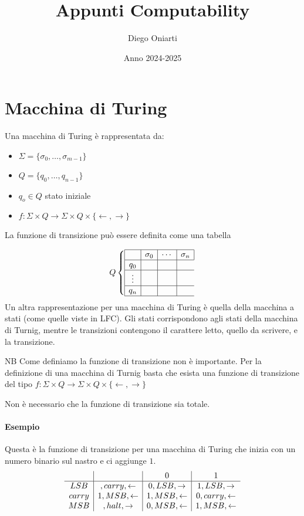 \documentclass{article}
\title{Appunti Computability}
\author{Diego Oniarti}
\date{Anno 2024-2025}
\begin{document}
\maketitle
\tableofcontents

\section{Macchina di Turing}
Una macchina di Turing è rappresentata da:
\begin{itemize}
    \item $\Sigma=\{\sigma_0,\dots,\sigma_{m-1}\}$
    \item $Q=\{q_0, \dots, q_{n-1}\}$
    \item $q_o \in Q$ stato iniziale
    \item $f:\Sigma\times Q \to \Sigma\times Q\times \{\leftarrow,\rightarrow\}$
\end{itemize}
La funzione di transizione può essere definita come una tabella

\[
    Q \left\{
        \begin{array}{|c|c|c|c|}
            \hline
            & \sigma_0 &\cdots& \sigma_n \\
            \hline
            q_0 & & \\
            \hline
            \vdots & & \\
            \hline
            q_n & & \\
            \hline
        \end{array}
    \right.
\]
Un altra rappresentazione per una macchina di Turing è quella della macchina a stati (come quelle viste in LFC). Gli stati corrispondono agli stati della macchina di Turnig, mentre le transizioni contengono il carattere letto, quello da scrivere, e la transizione.

\begin{callout}{NB}
    Come definiamo la funzione di transizione non è importante. Per la definizione di una macchina di Turnig basta che esista una funzione di transizione del tipo $f:\Sigma\times Q \to \Sigma\times Q\times \{\leftarrow,\rightarrow\}$

    Non è necessario che la funzione di transizione sia totale.
\end{callout}

\paragraph{Esempio}
Questa è la funzione di transizione per una macchina di Turing che inizia con un numero binario sul nastro e ci aggiunge $1$.
\[
    \begin{array}{c|c|c|c}
        & \textvisiblespace & 0 & 1 \\
        \hline
        LSB & \textvisiblespace,carry,\leftarrow & 0,LSB,\rightarrow & 1,LSB,\rightarrow \\
        carry & 1,MSB,\leftarrow& 1,MSB,\leftarrow& 0,carry,\leftarrow\\
        MSB & \textvisiblespace,halt,\rightarrow & 0,MSB,\leftarrow & 1,MSB,\leftarrow
    \end{array}
\]
\end{document}
